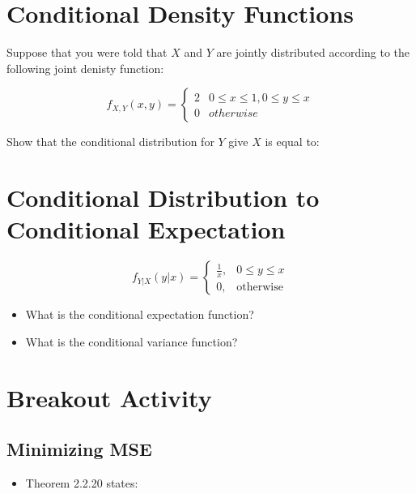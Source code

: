 \documentclass[
]{book}
\providecommand{\tightlist}{%
  \setlength{\itemsep}{0pt}\setlength{\parskip}{0pt}}
\theoremstyle{definition}
\theoremstyle{definition}
\theoremstyle{definition}
\theoremstyle{definition}
\theoremstyle{remark}
\begin{document}
\hypertarget{conditional-density-functions}{%
\section{Conditional Density Functions}\label{conditional-density-functions}}

Suppose that you were told that \(X\) and \(Y\) are jointly distributed according to the following joint denisty function:

\[ 
  f_{X,Y}(x,y) = 
    \begin{cases}
      2 & 0 \leq x \leq 1, 0 \leq y \leq x \\ 
      0 & otherwise
    \end{cases}
\]

Show that the conditional distribution for \(Y\) give \(X\) is equal to:

\hypertarget{conditional-distribution-to-conditional-expectation}{%
\section{Conditional Distribution to Conditional Expectation}\label{conditional-distribution-to-conditional-expectation}}

\[
f_{Y|X}(y|x) = 
  \begin{cases}
    \frac{1}{x}, & 0 \leq y \leq x \\ 
    0, & \text{otherwise}
  \end{cases}
\]

\begin{itemize}
\item
  What is the conditional expectation function?
\item
  What is the conditional variance function?
\end{itemize}

\hypertarget{breakout-activity}{%
\section{Breakout Activity}\label{breakout-activity}}

\hypertarget{minimizing-mse}{%
\subsection{Minimizing MSE}\label{minimizing-mse}}

\begin{itemize}
\tightlist
\item
  Theorem 2.2.20 states:
\end{itemize}
\end{document}
